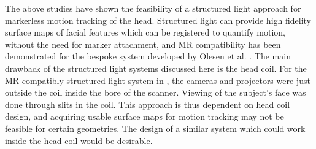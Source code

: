 \documentclass[class=article, crop=false]{standalone}
\begin{document}
\par 
The above studies have shown the feasibility of a structured light approach for markerless motion tracking of the head. Structured light can provide high fidelity surface maps of facial features which can be registered to quantify motion, without the need for marker attachment, and MR compatibility has been demonstrated for the bespoke system developed by Olesen et al. \parencite{Olesen2015a}. The main drawback of the structured light systems discussed here is the head coil. For the MR-compatibly structured light system in \parencite{Olesen2015a}, the cameras and projectors were just outside the coil inside the bore of the scanner. Viewing of the subject's face was done through slits in the coil. This approach is thus dependent on head coil design, and acquiring usable surface maps for motion tracking may not be feasible for certain geometries. The design of a similar system which could work inside the head coil would be desirable.
\end{document}
